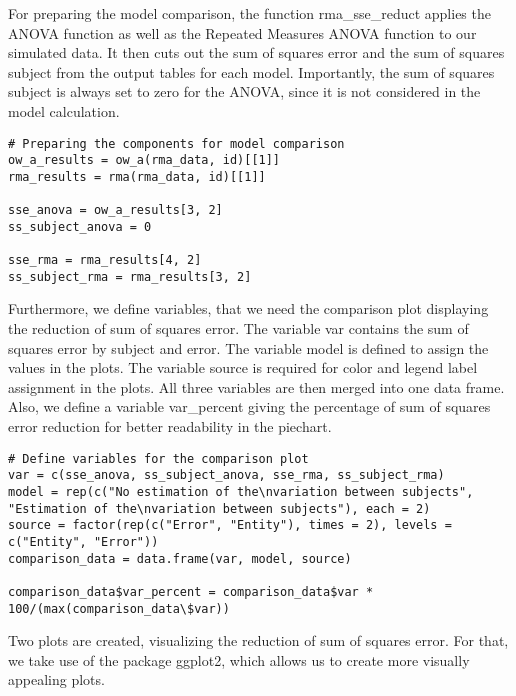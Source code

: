 \documentclass[11pt]{article}
\begin{document}
					For preparing the model comparison, the function rma_sse_reduct applies the ANOVA function as well as the Repeated Measures ANOVA function to our simulated data. It then cuts out the sum of squares error and the sum of squares subject from the output tables for each model. Importantly, the sum of squares subject is always set to zero for the ANOVA, since it is not considered in the model calculation.
    
\begin{lstlisting}
# Preparing the components for model comparison
ow_a_results = ow_a(rma_data, id)[[1]]
rma_results = rma(rma_data, id)[[1]]
    
sse_anova = ow_a_results[3, 2]
ss_subject_anova = 0
    
sse_rma = rma_results[4, 2]
ss_subject_rma = rma_results[3, 2]
\end{lstlisting}      
    
					Furthermore, we define variables, that we need the comparison plot displaying the reduction of sum of squares error. The variable var contains the sum of squares error by subject and error. The variable model is defined to assign the values in the plots. The variable source is required for color and legend label assignment in the plots. All three variables are then merged into one data frame. Also, we define a variable var_percent giving the percentage of sum of squares error reduction for better readability in the piechart.
	
\begin{lstlisting}	
# Define variables for the comparison plot
var = c(sse_anova, ss_subject_anova, sse_rma, ss_subject_rma)
model = rep(c("No estimation of the\nvariation between subjects", "Estimation of the\nvariation between subjects"), each = 2)
source = factor(rep(c("Error", "Entity"), times = 2), levels = c("Entity", "Error"))
comparison_data = data.frame(var, model, source)

comparison_data$var_percent = comparison_data$var * 100/(max(comparison_data\$var)) 
\end{lstlisting}        
    
		
				Two plots are created, visualizing the reduction of sum of squares error. For that, we take use of the package ggplot2, which allows us to create more visually appealing plots.
	
\end{document}
